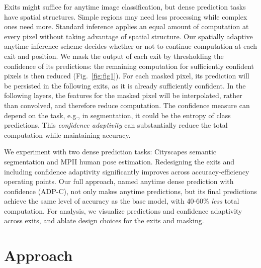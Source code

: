 Exits might suffice for anytime image classification, but dense prediction tasks have spatial structures.
Simple regions may need less processing while complex ones need more.
Standard inference applies an equal amount of computation at every pixel without taking advantage of spatial structure.
Our spatially adaptive anytime inference scheme decides whether or not to continue computation at each exit and position.
We mask the output of each exit by thresholding the confidence of its predictions: the remaining computation for sufficiently confident pixels is then reduced (Fig.~\ref{fig:fig1}).
For each masked pixel, its prediction will be persisted in the following exits, as it is already sufficiently confident.
In the following layers, the features for the masked pixel will be interpolated, rather than convolved, and therefore reduce computation.
The confidence measure can depend on the task, e.g., in segmentation, it could be the entropy of class predictions.
This \emph{confidence adaptivity} can substantially reduce the total computation while maintaining accuracy. 


We experiment with two dense prediction tasks: Cityscapes semantic segmentation and MPII human pose estimation. 
Redesigning the exits and including confidence adaptivity significantly improves across accuracy-efficiency operating points.
Our full approach, named anytime dense prediction with confidence (ADP-C), not only makes anytime predictions, but its final predictions achieve the same level of accuracy as the base model, with 40-60\% \emph{less} total computation.
For analysis, we visualize predictions and confidence adaptivity across exits, and ablate design choices for the exits and masking.


\section{Approach}
\label{sec:approach}

